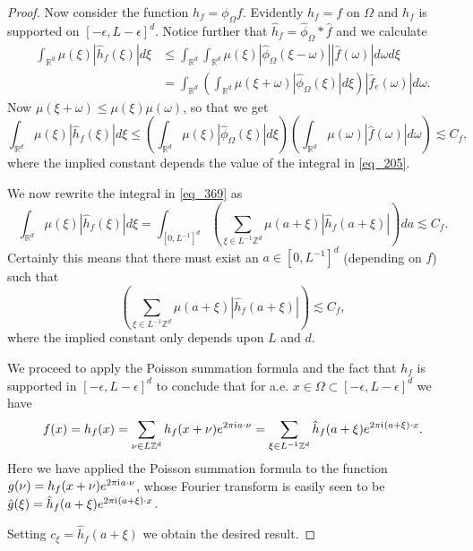 \begin{proof}
 Now consider the function $h_f = \phi_\Omega f$. Evidently $h_f = f$ on $\Omega$ and $h_f$ is supported on $[-\epsilon,L-\epsilon]^d$. Notice further that $\hat{h}_f = \hat{\phi}_\Omega * \hat{f}$ and we calculate
 \begin{equation}
  \begin{split}
  \int_{\mathbb{R}^d} \mu(\xi)|\hat{h}_f(\xi)|d\xi &\leq \int_{\mathbb{R}^d} \int_{\mathbb{R}^d}\mu(\xi) |\hat{\phi}_\Omega(\xi - \omega)||\hat{f}(\omega)| d\omega d\xi \\
  &=\int_{\mathbb{R}^d} \left(\int_{\mathbb{R}^d}\mu(\xi + \omega) |\hat{\phi}_\Omega(\xi)|d\xi\right)|\hat{f}_e(\omega)| d\omega. 
  \end{split}
 \end{equation}
 Now $\mu(\xi + \omega) \leq \mu(\xi)\mu(\omega)$, so that we get
 \begin{equation}\label{eq_369}
  \int_{\mathbb{R}^d} \mu(\xi)|\hat{h}_f(\xi)|d\xi \leq \left(\int_{\mathbb{R}^d}\mu(\xi) |\hat{\phi}_\Omega(\xi)|d\xi\right)\left(\int_{\mathbb{R}^d}\mu(\omega) |\hat{f}(\omega)|d\omega\right) \lesssim C_f,
 \end{equation}
 where the implied constant depends the value of the integral in \eqref{eq_205}.
 
 We now rewrite the integral in \eqref{eq_369} as
 \begin{equation}
  \int_{\mathbb{R}^d} \mu(\xi)|\hat{h}_f(\xi)|d\xi = \int_{[0,L^{-1}]^d} \left(\sum_{\xi\in L^{-1}\mathbb{Z}^d} \mu(a+\xi)|\hat{h}_f(a+\xi)|\right)da \lesssim C_f.
 \end{equation}
 Certainly this means that there must exist an $a\in [0,L^{-1}]^d$ (depending on $f$) such that
 \begin{equation}
  \left(\sum_{\xi\in L^{-1}\mathbb{Z}^d} \mu(a+\xi)|\hat{h}_f(a+\xi)|\right) \lesssim C_f,
 \end{equation}
 where the implied constant only depends upon $L$ and $d$.
 
 We proceed to apply the Poisson summation formula and the fact that $h_f$ is supported in $[-\epsilon,L-\epsilon]^d$ to conclude that for a.e. $x\in \Omega \subset [-\epsilon,L-\epsilon]^d$ we have
 \begin{equation}
  f(x) = h_f(x) = \sum_{\nu \in L\mathbb{Z}^d} h_f(x+\nu)e^{2\pi {\mathrm{i}\mkern1mu}  a\cdot \nu} = \sum_{\xi\in L^{-1}\mathbb{Z}^d}\hat{h}_f(a+\xi) e^{2\pi {\mathrm{i}\mkern1mu}  (a+\xi)\cdot x}. 
 \end{equation}
 Here we have applied the Poisson summation formula to the function $g(\nu) = h_f(x+\nu)e^{2\pi {\mathrm{i}\mkern1mu}  a\cdot \nu}$, whose Fourier transform is easily seen to be $\hat{g}(\xi) = \hat{h}_f(a+\xi) e^{2\pi {\mathrm{i}\mkern1mu}  (a+\xi)\cdot x}$.
 
 Setting $c_\xi = \hat{h}_f(a+\xi)$ we obtain the desired result.
\end{proof}

